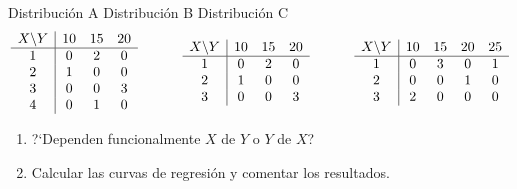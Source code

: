 \documentclass[11pt]{book}
\begin{document}
\begin{enumerate}
\hskip 2cm Distribuci{\'o}n A  \hskip 2cm Distribuci{\'o}n B \hskip 2.2cm Distribuci{\'o}n C
\vskip -0.5cm $$
 \left .
    \begin{array}{c|ccc}
   X \backslash Y & 10 & 15 & 20 \\ \hline
           1  &  0 &  2 &  0  \\
           2  &  1 &  0 &  0  \\
           3  &  0 &  0 &  3  \\
           4  &  0 &  1 &  0  \\
    \end{array}
\right .
\hskip 1cm
\left .
    \begin{array}{c|ccc}
        X \backslash Y & 10 & 15 & 20 \\ \hline
           1  &  0 &  2 &  0  \\
           2  &  1 &  0 &  0  \\
           3  &  0 &  0 &  3  \\
    \end{array}
\right .
\hskip 1cm
 \left .
    \begin{array}{c|cccc}
        X \backslash Y & 10 & 15 & 20  & 25 \\ \hline
           1  &  0 &  3 &  0  & 1 \\
           2  &  0 &  0 &  1  & 0 \\
           3  &  2 &  0 &  0  & 0 \\
    \end{array}
\right .
$$

  \begin{enumerate}
     \item ?`Dependen funcionalmente $X$ de $Y$ o $Y$ de $X$?
     \item Calcular las curvas de regresi{\'o}n y comentar los resultados.

  \end{enumerate}



\end{enumerate}
\end{document}
